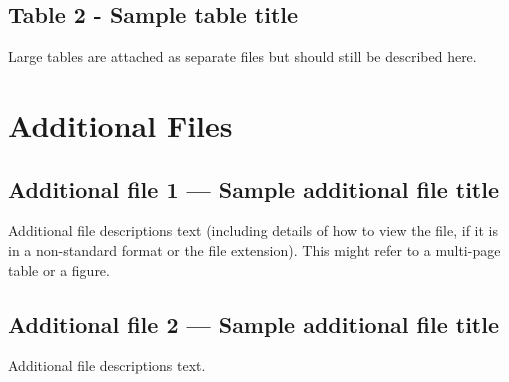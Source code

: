 \documentclass[10pt]{bmc_article}
\newenvironment{bmcformat}{\begin{raggedright}\baselineskip20pt\sloppy\setboolean{publ}{false}}{\end{raggedright}\baselineskip20pt\sloppy}
\begin{document}
\begin{bmcformat}
  \subsection*{Table 2 - Sample table title}
    Large tables are attached as separate files but should
    still be described here.




\section*{Additional Files}
  \subsection*{Additional file 1 --- Sample additional file title}
    Additional file descriptions text (including details of how to
    view the file, if it is in a non-standard format or the file extension).  This might
    refer to a multi-page table or a figure.

  \subsection*{Additional file 2 --- Sample additional file title}
    Additional file descriptions text.


\end{bmcformat}
\end{document}
